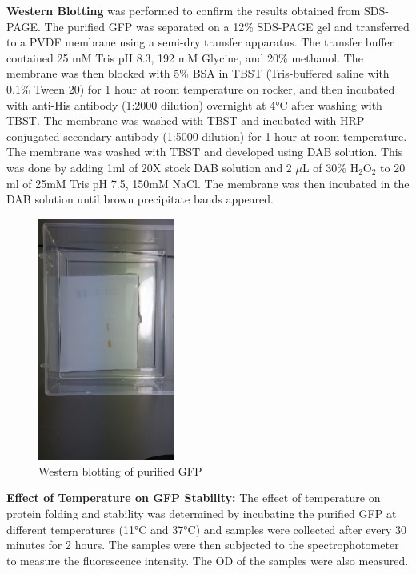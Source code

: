 \documentclass[twoside]{article}
\begin{document}
\begin{multicols}{2}
\textbf{Western Blotting} was performed to confirm the results obtained from SDS-PAGE.
The purified GFP was separated on a 12\% SDS-PAGE gel and transferred to a PVDF membrane using a semi-dry transfer apparatus.
The transfer buffer contained 25 mM Tris pH 8.3, 192 mM Glycine, and 20\% methanol.
The membrane was then blocked with 5\% BSA in TBST (Tris-buffered saline with 0.1\% Tween 20) for 1 hour at room temperature on rocker,
and then incubated with anti-His antibody (1:2000 dilution) overnight at 4°C after washing with TBST.
The membrane was washed with TBST and incubated with HRP-conjugated secondary antibody (1:5000 dilution) for 1 hour at room temperature.
The membrane was washed with TBST and developed using DAB solution. This was done by adding 1ml of 20X stock DAB solution and 2 $\mu$L of 30\% H$_2$O$_2$ to 20 ml of 25mM Tris pH 7.5, 
150mM NaCl. The membrane was then incubated in the DAB solution until brown precipitate bands appeared.

\begin{figure}[H]
    \centering
    \includegraphics[width=0.4\textwidth]{Western_membrane.jpg}
    \caption{Western blotting of purified GFP}
    \label{fig:Western_blotting}
\end{figure}

\textbf{Effect of Temperature on GFP Stability:}
The effect of temperature on protein folding and stability was determined by incubating the purified GFP at different temperatures 
(11°C and 37°C) and samples were collected after every 30 minutes for 2 hours. The samples were then subjected to the spectrophotometer
to measure the fluorescence intensity. The OD of the samples were also measured.



\end{multicols}
\end{document}
